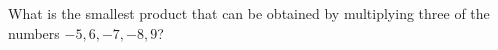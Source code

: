 What is the smallest product that can be obtained by multiplying three of the numbers $-5,6,-7,-8,9$?
